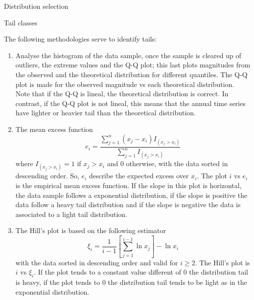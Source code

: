 \documentclass[8pt]{beamer}
\renewcommand{\emph}[1]{\textcolor{myorange}{#1}}
\begin{document}
\begin{frame}{Distribution selection}
            \vspace{-5pt}
    \begin{block}{Tail classes}
    \end{block}
            \vspace{-7pt}
    The following methodologies serve to identify tails:
    \begin{enumerate}
        \item Analyse the \emph{histogram} of the data sample, once the sample is cleared up of outliers, the extreme values  and the \emph{Q-Q plot}; this last plots magnitudes from the observed and the theoretical distribution for different quantiles. The \emph{Q-Q plot} is made for the observed magnitude vs each theoretical distribution. Note that if the \emph{Q-Q} is lineal, the theoretical distribution is correct. In contrast, if the \emph{Q-Q plot} is not lineal, this means that the annual time series have lighter or heavier tail than the theoretical distribution. 
        \item The \alert{mean excess function} 
            \vspace{-8pt}
            \[
                e_i = \frac{\sum_{j=1}^n (x_j - x_i) I_{(x_j > x_i )}}{\sum_{j=1}^n I_{(x_j > x_i )}}
            \]
            where $I_{(x_j > x_i)} = 1$ if $x_j > x_i $ and 0 otherwise, with the data sorted in descending order. So, $e_i$ describe the expected excess over $x_i$. The plot $i$ vs $e_i$ is the empirical \emph{mean excess function}. If the \emph{slope} in this plot is horizontal, the data sample follows a \emph{exponential distribution}, if the \emph{slope}  is positive the data follow a \emph{heavy tail distribution} and if the \emph{slope} is negative the data is associated to a \emph{light tail distribution}.
        \item The \alert{Hill's plot} is based on the following estimator
            \vspace{-5pt}
            \[
                \xi_i = \frac{1}{i-1} \left[ \sum_{j=1}^{i-1} \ln x_j \right] - \ln x_i
            \]
            with the data sorted in descending order and valid for $i \geq 2$. The \emph{Hill's plot} is $i$ vs $\xi_i$. If the plot tends to a constant value different of 0 the distribution tail is heavy, if the plot tends to 0 the distribution tail tends to be light as in the \emph{exponential distribution}.  

    \end{enumerate}
\end{frame}
\end{document}
